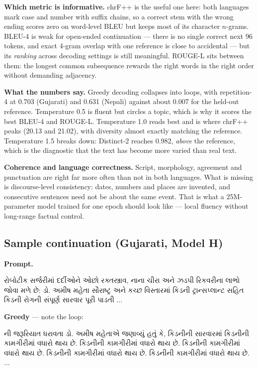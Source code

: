 \documentclass[11pt,a4paper]{article}
\newcommand{\gujaratitext}[1]{{\gujaratifont #1}}
\begin{document}
\textbf{Which metric is informative.} chrF++ is the useful one here: both
languages mark case and number with suffix chains, so a correct stem with the
wrong ending scores zero on word-level BLEU but keeps most of its character
$n$-grams. BLEU-4 is weak for open-ended continuation --- there is no single
correct next 96 tokens, and exact 4-gram overlap with one reference is close to
accidental --- but its \emph{ranking} across decoding settings is still
meaningful. ROUGE-L sits between them: the longest common subsequence rewards the
right words in the right order without demanding adjacency.

\textbf{What the numbers say.} Greedy decoding collapses into loops, with
repetition-4 at 0.703 (Gujarati) and 0.631 (Nepali) against
about 0.007 for the held-out reference.
Temperature 0.5 is fluent but circles a topic, which is why it scores the best
BLEU-4 and ROUGE-L. Temperature 1.0 reads best and is where chrF++ peaks
(20.13 and 21.02), with diversity almost exactly matching the
reference. Temperature 1.5 breaks down: Distinct-2 reaches 0.982, \emph{above}
the reference, which is the diagnostic that the text has become more varied than
real text.

\textbf{Coherence and language correctness.} Script, morphology, agreement and
punctuation are right far more often than not in both languages. What is missing
is discourse-level consistency: dates, numbers and places are invented, and
consecutive sentences need not be about the same event. That is what a
25M-parameter model trained for one epoch should look like --- local fluency
without long-range factual control.


\subsection{Sample continuation (Gujarati, Model H)}

\textbf{Prompt.} 

\gujaratitext{રોબોટીક સર્જરીમાં દર્દીઓને ઓછો રક્તસ્ત્રાવ, નાના ચીરા અને ઝડપી રિકવરીના લાભો જોવા મળે છે: ડો. અમીષ મહેતા સૌરાષ્ટ્ર અને કચ્છ વિસ્તારમાં કિડની ટ્રાન્સપ્લાન્ટ સહિત કિડની રોગની સંપૂર્ણ સારવાર પૂરી પાડતી ...}





\textbf{Greedy} --- note the loop: 

\gujaratitext{ની જરૂરિયાત ધરાવતા ડો. અમીષ મહેતાએ જણાવ્યું હતું કે, કિડનીની સારવારમાં કિડનીની કામગીરીમાં વધારો થાય છે. કિડનીની કામગીરીમાં વધારો થાય છે. કિડનીની કામગીરીમાં વધારો થાય છે. કિડનીની કામગીરીમાં વધારો થાય છે. કિડનીની કામગીરીમાં વધારો થાય છે. ...}
\end{document}
